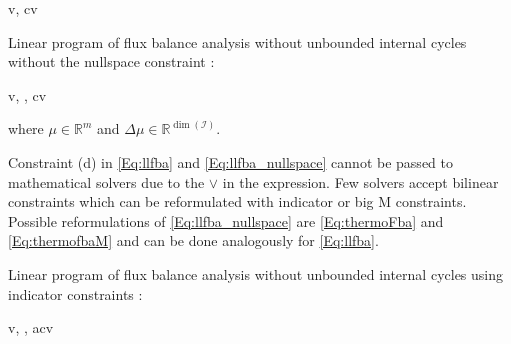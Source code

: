 \begin{maxi!}
    {\scriptstyle v, \Delta \mu}{c\tran v}{ \label{Eq:llfba_nullspace}}{}
\end{maxi!}


Linear program of flux balance analysis without unbounded internal cycles without the nullspace constraint \cite{muller_fast_2013}:

\begin{maxi!}
    {\scriptstyle v, \Delta \mu, \mu}{c\tran v}{ \label{Eq:llfba}}{}
\end{maxi!}
where $\mu \in \mathbb{R}^m$ and $\Delta \mu \in \mathbb{R}^{\dim (\mathcal{I})}$. 

Constraint (d) in \cref{Eq:llfba} and \cref{Eq:llfba_nullspace} cannot be passed to mathematical solvers due to the $\lor$ in the expression. Few solvers accept bilinear constraints which can be reformulated with indicator or big M constraints. Possible reformulations of \cref{Eq:llfba_nullspace} are \cref{Eq:thermoFba} and \cref{Eq:thermofbaM} and can be done analogously for \cref{Eq:llfba}.

Linear program of flux balance analysis without unbounded internal cycles using indicator constraints \cite{elimination_infeasible_loops}:

\begin{maxi!}
    {\scriptstyle v, \Delta \mu, a}{c\tran v}{ \label{Eq:thermo_fba_indicator}}{}
\end{maxi!}


